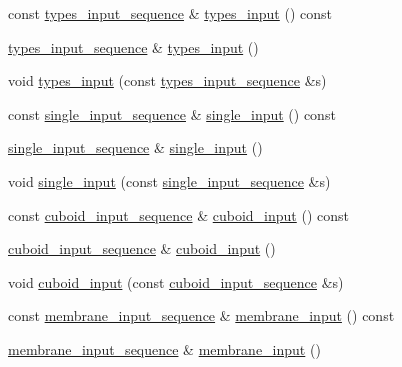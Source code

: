 \begin{DoxyCompactItemize}
\item 
const \hyperlink{classinput__t_a48f5b9f6b00c9d3749caf0e3a0eac5a7}{types\+\_\+input\+\_\+sequence} \& \hyperlink{classinput__t_aad81ec0c8587d9ed3c0390cc9ba75bb0}{types\+\_\+input} () const 
\item 
\hyperlink{classinput__t_a48f5b9f6b00c9d3749caf0e3a0eac5a7}{types\+\_\+input\+\_\+sequence} \& \hyperlink{classinput__t_a70e55b1ecc015b3e00101928dfbe5464}{types\+\_\+input} ()
\item 
void \hyperlink{classinput__t_a8a371e78d74ad9f67271745117ad478a}{types\+\_\+input} (const \hyperlink{classinput__t_a48f5b9f6b00c9d3749caf0e3a0eac5a7}{types\+\_\+input\+\_\+sequence} \&s)
\item 
const \hyperlink{classinput__t_a1296075494d97da854dc2be8b1022061}{single\+\_\+input\+\_\+sequence} \& \hyperlink{classinput__t_a23df17feba2a762f381167fbd900e3e2}{single\+\_\+input} () const 
\item 
\hyperlink{classinput__t_a1296075494d97da854dc2be8b1022061}{single\+\_\+input\+\_\+sequence} \& \hyperlink{classinput__t_abf4899015034fd15a532960d94af0388}{single\+\_\+input} ()
\item 
void \hyperlink{classinput__t_a76b473ba9a3a25f8d2c7ed2c02489c2d}{single\+\_\+input} (const \hyperlink{classinput__t_a1296075494d97da854dc2be8b1022061}{single\+\_\+input\+\_\+sequence} \&s)
\item 
const \hyperlink{classinput__t_a5aef33216e01e60c197cea604a519ab4}{cuboid\+\_\+input\+\_\+sequence} \& \hyperlink{classinput__t_a59b8093194c770faf0efcf86eb7a7383}{cuboid\+\_\+input} () const 
\item 
\hyperlink{classinput__t_a5aef33216e01e60c197cea604a519ab4}{cuboid\+\_\+input\+\_\+sequence} \& \hyperlink{classinput__t_af66b8c90f49b958d6e5f2b236abad9b2}{cuboid\+\_\+input} ()
\item 
void \hyperlink{classinput__t_a4d1a25864dfaf5d4ab006425538b1125}{cuboid\+\_\+input} (const \hyperlink{classinput__t_a5aef33216e01e60c197cea604a519ab4}{cuboid\+\_\+input\+\_\+sequence} \&s)
\item 
const \hyperlink{classinput__t_a455e36bc8b009abdbd13c6d167864cfe}{membrane\+\_\+input\+\_\+sequence} \& \hyperlink{classinput__t_adba6d36e90b80fe27862a3f7fc5fbf2a}{membrane\+\_\+input} () const 
\item 
\hyperlink{classinput__t_a455e36bc8b009abdbd13c6d167864cfe}{membrane\+\_\+input\+\_\+sequence} \& \hyperlink{classinput__t_a921b08f23c98a6c2aa7f4fb0c707a3ea}{membrane\+\_\+input} ()

\end{DoxyCompactItemize}
